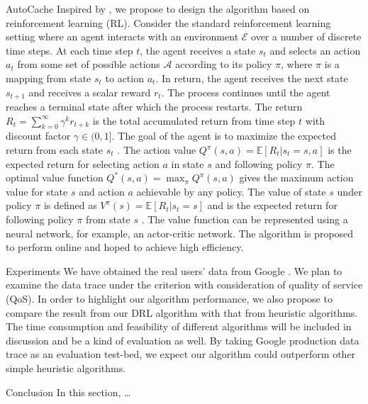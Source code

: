 \documentclass{article}
\begin{document}
\begin{section}{AutoCache}
    \label{algorithm}
    Inspired by \cite{Pensieve}, we propose to design the algorithm based on reinforcement learning (RL). Consider the standard reinforcement learning setting where an agent interacts with an environment $\mathcal{E}$ over a number of discrete time steps. At each time step $t$, the agent receives a state $s_t$ and selects an action $a_t$ from some set of possible actions $\mathcal{A}$ according to its policy $\pi$, where $\pi$ is a mapping from state $s_t$ to action $a_t$. In return, the agent receives the next state $s_{t+1}$ and receives a scalar reward $r_t$. The process continues until the agent reaches a terminal state after which the process restarts. The return $R_t=\sum_{k=0}^{\infty}\gamma^k r_{t+k}$ is the total accumulated return from time step $t$ with discount factor $\gamma\in(0,1]$. The goal of the agent is to maximize the expected return from each state $s_t$ \cite{rl-intro}. The action value $Q^{\pi}(s,a)=\mathbb{E}[R_t|s_t=s,a]$ is the expected return for selecting action $a$ in state $s$ and following policy $\pi$. The optimal value function $Q^*(s,a)=\max_{\pi}Q^{\pi}(s,a)$ gives the maximum action value for state $s$ and action $a$ achievable by any policy. The value of state $s$ under policy $\pi$ is defined as $V^{\pi}(s)=\mathbb{E}[R_t|s_t=s]$ and is the expected return for following policy $\pi$ from state $s$ \cite{DBLP:journals/corr/MnihBMGLHSK16}. The value function can be represented using a neural network, for example, an actor-critic network. The algorithm is proposed to perform online and hoped to achieve high efficiency.
\end{section}

\begin{section}{Experiments}
    \label{exp}
    We have obtained the real users' data from Google \cite{clusterdata:Reiss2011}. We plan to examine the data trace under the criterion with consideration of quality of service (QoS). In order to highlight our algorithm performance, we also propose to compare the result from our DRL algorithm with that from heuristic algorithms. The time consumption and feasibility of different algorithms will be included in discussion and be a kind of evaluation as well. By taking Google production data trace as an evaluation test-bed, we expect our algorithm could outperform other simple heuristic algorithms.
\end{section}

\begin{section}{Conclusion}
    \label{summary}
    In this section, \dots
\end{section}




\end{document}
